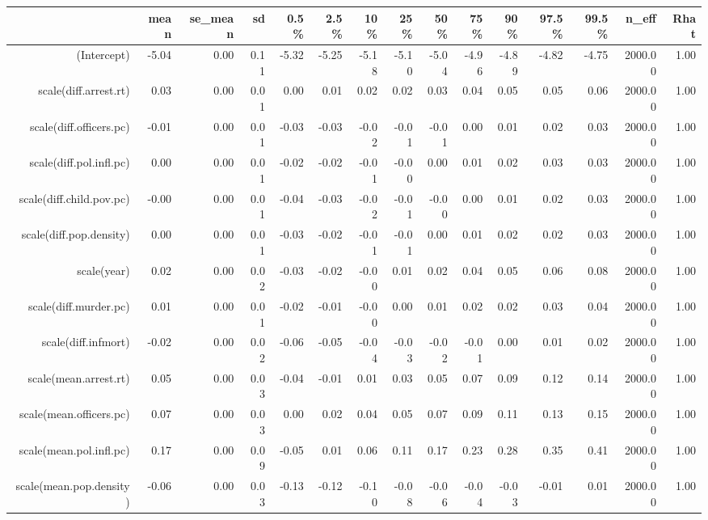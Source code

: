\begin{table}[ht]
\centering
\begin{tabular}{rrrrrrrrrrrrrrr}
  \hline
 & mean & se\_mean & sd & 0.5\% & 2.5\% & 10\% & 25\% & 50\% & 75\% & 90\% & 97.5\% & 99.5\% & n\_eff & Rhat \\ 
  \hline
(Intercept) & -5.04 & 0.00 & 0.11 & -5.32 & -5.25 & -5.18 & -5.10 & -5.04 & -4.96 & -4.89 & -4.82 & -4.75 & 2000.00 & 1.00 \\ 
  scale(diff.arrest.rt) & 0.03 & 0.00 & 0.01 & 0.00 & 0.01 & 0.02 & 0.02 & 0.03 & 0.04 & 0.05 & 0.05 & 0.06 & 2000.00 & 1.00 \\ 
  scale(diff.officers.pc) & -0.01 & 0.00 & 0.01 & -0.03 & -0.03 & -0.02 & -0.01 & -0.01 & 0.00 & 0.01 & 0.02 & 0.03 & 2000.00 & 1.00 \\ 
  scale(diff.pol.infl.pc) & 0.00 & 0.00 & 0.01 & -0.02 & -0.02 & -0.01 & -0.00 & 0.00 & 0.01 & 0.02 & 0.03 & 0.03 & 2000.00 & 1.00 \\ 
  scale(diff.child.pov.pc) & -0.00 & 0.00 & 0.01 & -0.04 & -0.03 & -0.02 & -0.01 & -0.00 & 0.00 & 0.01 & 0.02 & 0.03 & 2000.00 & 1.00 \\ 
  scale(diff.pop.density) & 0.00 & 0.00 & 0.01 & -0.03 & -0.02 & -0.01 & -0.01 & 0.00 & 0.01 & 0.02 & 0.02 & 0.03 & 2000.00 & 1.00 \\ 
  scale(year) & 0.02 & 0.00 & 0.02 & -0.03 & -0.02 & -0.00 & 0.01 & 0.02 & 0.04 & 0.05 & 0.06 & 0.08 & 2000.00 & 1.00 \\ 
  scale(diff.murder.pc) & 0.01 & 0.00 & 0.01 & -0.02 & -0.01 & -0.00 & 0.00 & 0.01 & 0.02 & 0.02 & 0.03 & 0.04 & 2000.00 & 1.00 \\ 
  scale(diff.infmort) & -0.02 & 0.00 & 0.02 & -0.06 & -0.05 & -0.04 & -0.03 & -0.02 & -0.01 & 0.00 & 0.01 & 0.02 & 2000.00 & 1.00 \\ 
  scale(mean.arrest.rt) & 0.05 & 0.00 & 0.03 & -0.04 & -0.01 & 0.01 & 0.03 & 0.05 & 0.07 & 0.09 & 0.12 & 0.14 & 2000.00 & 1.00 \\ 
  scale(mean.officers.pc) & 0.07 & 0.00 & 0.03 & 0.00 & 0.02 & 0.04 & 0.05 & 0.07 & 0.09 & 0.11 & 0.13 & 0.15 & 2000.00 & 1.00 \\ 
  scale(mean.pol.infl.pc) & 0.17 & 0.00 & 0.09 & -0.05 & 0.01 & 0.06 & 0.11 & 0.17 & 0.23 & 0.28 & 0.35 & 0.41 & 2000.00 & 1.00 \\ 
  scale(mean.pop.density) & -0.06 & 0.00 & 0.03 & -0.13 & -0.12 & -0.10 & -0.08 & -0.06 & -0.04 & -0.03 & -0.01 & 0.01 & 2000.00 & 1.00 \\ 

\end{tabular}
\end{table}
